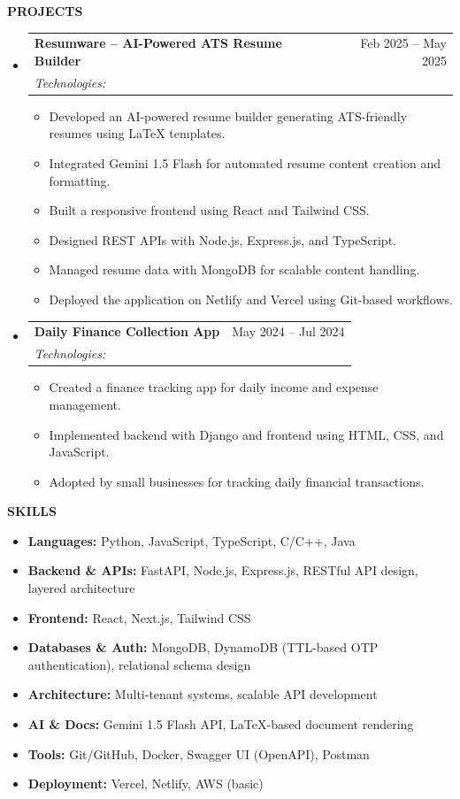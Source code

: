 \documentclass[a4paper,10pt]{article}
\makeatletter
\newcommand{\resheading}[1]{
  \vspace{8pt}
  {\color{black} \textbf{\large #1}}
  \vspace{-5pt}
  \hrulefill
  \vspace{3pt}
}
\newcommand{\ressubheading}[4]{
  \begin{tabular*}{\textwidth}{l@{\extracolsep{\fill}}r}
    \textbf{#1} & #2 \\
    \textit{\small #3} & \textit{\small #4} \\
  \end{tabular*}\vspace{-5pt}
}
\newcommand{\resitem}[1]{
  \item \small{
    {#1 \vspace{-2pt}}
  }
}
\makeatother
\begin{document}
\resheading{PROJECTS}
\begin{itemize}[leftmargin=*,nosep]
\item[] \ressubheading{Resumware – AI-Powered ATS Resume Builder}{Feb 2025 – May 2025}{Technologies: }{}
\begin{itemize}[leftmargin=12pt,nosep,topsep=2pt]
  \resitem{Developed an AI-powered resume builder generating ATS-friendly resumes using LaTeX templates.}
  \resitem{Integrated Gemini 1.5 Flash for automated resume content creation and formatting.}
  \resitem{Built a responsive frontend using React and Tailwind CSS.}
  \resitem{Designed REST APIs with Node.js, Express.js, and TypeScript.}
  \resitem{Managed resume data with MongoDB for scalable content handling.}
  \resitem{Deployed the application on Netlify and Vercel using Git-based workflows.}
\end{itemize}
\item[] \ressubheading{Daily Finance Collection App}{May 2024 – Jul 2024}{Technologies: }{}
\begin{itemize}[leftmargin=12pt,nosep,topsep=2pt]
  \resitem{Created a finance tracking app for daily income and expense management.}
  \resitem{Implemented backend with Django and frontend using HTML, CSS, and JavaScript.}
  \resitem{Adopted by small businesses for tracking daily financial transactions.}
\end{itemize}
\end{itemize}

\resheading{SKILLS}
\begin{itemize}[leftmargin=12pt,nosep,topsep=2pt]
  \item[] \small \textbf{Languages:} Python, JavaScript, TypeScript, C/C++, Java
  \item[] \small \textbf{Backend \& APIs:} FastAPI, Node.js, Express.js, RESTful API design, layered architecture
  \item[] \small \textbf{Frontend:} React, Next.js, Tailwind CSS
  \item[] \small \textbf{Databases \& Auth:} MongoDB, DynamoDB (TTL-based OTP authentication), relational schema design
  \item[] \small \textbf{Architecture:} Multi-tenant systems, scalable API development
  \item[] \small \textbf{AI \& Docs:} Gemini 1.5 Flash API, LaTeX-based document rendering
  \item[] \small \textbf{Tools:} Git/GitHub, Docker, Swagger UI (OpenAPI), Postman
  \item[] \small \textbf{Deployment:} Vercel, Netlify, AWS (basic)
\end{itemize}
\end{document}
